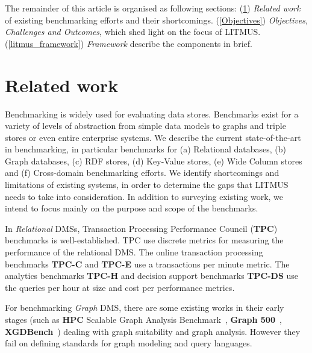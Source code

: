 \documentclass{llncs}
\begin{document}
 
The remainder of this article is organised as following sections: 
(\ref{relwork}) \textit{Related work} of existing benchmarking efforts and their shortcomings. 
(\ref{Objectives}) \textit{Objectives, Challenges and Outcomes}, which shed light on the focus of LITMUS.
(\ref{litmus_framework}) \textit{Framework} describe the components in brief.  



\section{Related work}\label{relwork}

Benchmarking is widely used for evaluating data stores. 
Benchmarks exist for a variety of levels of abstraction from simple data models to graphs and triple stores or even entire enterprise systems.
We describe the current state-of-the-art in benchmarking, in particular benchmarks for (a) Relational databases, (b) Graph databases, (c) RDF stores, (d) Key-Value stores, (e) Wide Column stores and (f) Cross-domain benchmarking efforts.
We identify shortcomings and limitations of existing systems, in order to determine the gaps that LITMUS needs to take into consideration.
In addition to surveying existing work, we intend to focus mainly on the purpose and scope of the benchmarks.
    
    In \textit{Relational} DMSs, Transaction Processing Performance Council (\textbf{TPC})~\cite{Nambiar2011} benchmarks is well-established.
    TPC use discrete metrics for measuring the performance of the relational DMS. The online transaction processing benchmarks \textbf{TPC-C} and \textbf{TPC-E} use a transactions per minute metric. The analytics benchmarks \textbf{TPC-H} and decision support benchmarks \textbf{TPC-DS} use the queries per hour at size and cost per performance metrics.
    
    For benchmarking \textit{Graph} DMS, there are some existing works in their early stages (such as \textbf{HPC} Scalable Graph Analysis Benchmark~\cite{Dominguez-Sal:2010:SGD:1927585.1927590}, \textbf{Graph 500}~\cite{murphy2010introducing}, \textbf{XGDBench}~\cite{conf/cloudcom/DayarathnaS12}) dealing with graph suitability and graph analysis. However they fail on defining standards for graph modeling and query languages.
    
\end{document}
